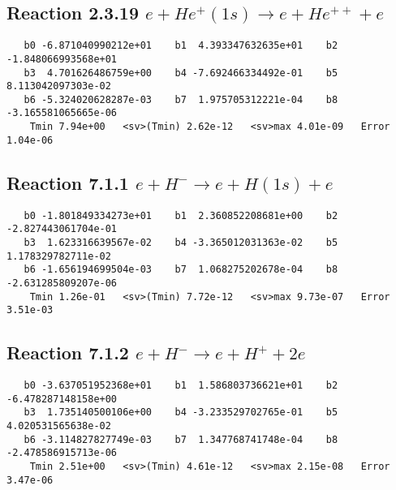 \documentclass[12pt]{article}
\begin{document}
\newpage
\subsection{
Reaction 2.3.19 $  e + He^+(1s) \rightarrow e + He^{++} + e$}


\begin{small}\begin{verbatim}
   b0 -6.871040990212e+01    b1  4.393347632635e+01    b2 -1.848066993568e+01
   b3  4.701626486759e+00    b4 -7.692466334492e-01    b5  8.113042097303e-02
   b6 -5.324020628287e-03    b7  1.975705312221e-04    b8 -3.165581065665e-06
    Tmin 7.94e+00   <sv>(Tmin) 2.62e-12   <sv>max 4.01e-09   Error 1.04e-06
\end{verbatim}\end{small}

\newpage
\subsection{
Reaction 7.1.1 $   e + H^- \rightarrow e + H(1s) + e$}


\begin{small}\begin{verbatim}
   b0 -1.801849334273e+01    b1  2.360852208681e+00    b2 -2.827443061704e-01
   b3  1.623316639567e-02    b4 -3.365012031363e-02    b5  1.178329782711e-02
   b6 -1.656194699504e-03    b7  1.068275202678e-04    b8 -2.631285809207e-06
    Tmin 1.26e-01   <sv>(Tmin) 7.72e-12   <sv>max 9.73e-07   Error 3.51e-03
\end{verbatim}\end{small}




                              


\newpage
\subsection{
Reaction 7.1.2 $   e + H^- \rightarrow e + H^+ + 2e$}


\begin{small}\begin{verbatim}
   b0 -3.637051952368e+01    b1  1.586803736621e+01    b2 -6.478287148158e+00
   b3  1.735140500106e+00    b4 -3.233529702765e-01    b5  4.020531565638e-02
   b6 -3.114827827749e-03    b7  1.347768741748e-04    b8 -2.478586915713e-06
    Tmin 2.51e+00   <sv>(Tmin) 4.61e-12   <sv>max 2.15e-08   Error 3.47e-06
\end{verbatim}\end{small}
\end{document}
